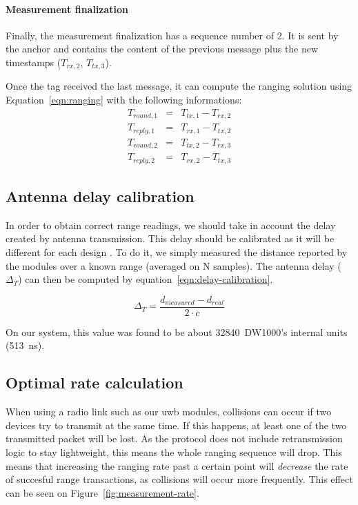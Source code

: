 \documentclass[a4paper, 12pt]{scrreprt}
\begin{document}
\paragraph{Measurement finalization}
Finally, the measurement finalization has a sequence number of 2.
It is sent by the anchor and contains the content of the previous message plus the new timestamps ($T_{rx,2}$, $T_{tx,3}$).

Once the tag received the last message, it can compute the ranging solution using Equation~\ref{eqn:ranging} with the following informations:
\begin{eqnarray*}
    T_{round,1} &=& T_{tx,1} - T_{rx,2} \\
    T_{reply,1} &=& T_{rx,1} - T_{tx,2} \\
    T_{round,2} &=& T_{tx,2} - T_{rx,3} \\
    T_{reply,2} &=& T_{rx,2} - T_{tx,3}
\end{eqnarray*}



\subsection{Antenna delay calibration}
In order to obtain correct range readings, we should take in account the delay created by antenna transmission.
This delay should be calibrated as it will be different for each design \cite{dw1000manual}.
To do it, we simply measured the distance reported by the modules over a known range (averaged on N samples).
The antenna delay ($\Delta_T$) can then be computed by equation~\ref{eqn:delay-calibration}.

\begin{equation}
    \Delta_T = \frac{d_{measured} - d_{real}}{2\cdot c}
    \label{eqn:delay-calibration}
\end{equation}

On our system, this value was found to be about 32840~DW1000's internal units (\SI{513}{\nano\second}).


\subsection{Optimal rate calculation}
\label{sec:optimal-rate}
When using a radio link such as our \gls{uwb} modules, collisions can occur if two devices try to transmit at the same time.
If this happens, at least one of the two transmitted packet will be lost.
As the protocol does not include retransmission logic to stay lightweight, this means the whole ranging sequence will drop.
This means that increasing the ranging rate past a certain point will \emph{decrease} the rate of succesful range transactions, as collisions will occur more frequently.
This effect can be seen on Figure~\ref{fig:measurement-rate}.
\end{document}
